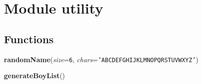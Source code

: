 %
%
%


\section{Module utility}

    \label{utility}


  \subsection{Functions}

    \label{utility:randomName}

    \vspace{0.5ex}

\hspace{.8\funcindent}\begin{boxedminipage}{\funcwidth}

    \raggedright \textbf{randomName}(\textit{size}={\tt 6}, \textit{chars}={\tt \texttt{'}\texttt{ABCDEFGHIJKLMNOPQRSTUVWXYZ}\texttt{'}})

\setlength{\parskip}{2ex}
\setlength{\parskip}{1ex}
    \end{boxedminipage}

    \label{utility:generateBoyList}

    \vspace{0.5ex}

\hspace{.8\funcindent}\begin{boxedminipage}{\funcwidth}

    \raggedright \textbf{generateBoyList}()

\setlength{\parskip}{2ex}
\setlength{\parskip}{1ex}
    \end{boxedminipage}

